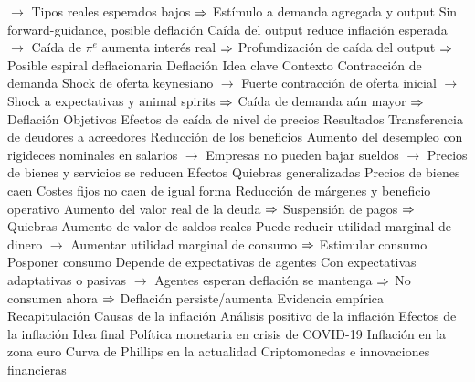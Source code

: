 \documentclass{nuevotema}
\begin{document}
\begin{esquemal}
				\4[] $\to$ Tipos reales esperados bajos
				\4[] $\Rightarrow$ Estímulo a demanda agregada y output
				\4 Sin forward-guidance, posible deflación
				\4[] Caída del output reduce inflación esperada
				\4[] $\to$ Caída de $\pi^e$ aumenta interés real
				\4[] $\Rightarrow$ Profundización de caída del output
				\4[] $\Rightarrow$ Posible espiral deflacionaria
		\2 Deflación
			\3 Idea clave
				\4 Contexto
				\4[] Contracción de demanda
				\4[] Shock de oferta keynesiano
				\4[] $\to$ Fuerte contracción de oferta inicial
				\4[] $\to$ Shock a expectativas y animal spirits
				\4[] $\Rightarrow$ Caída de demanda aún mayor
				\4[] $\Rightarrow$ Deflación
				\4 Objetivos
				\4[] Efectos de caída de nivel de precios
				\4 Resultados
				\4[] Transferencia de deudores a acreedores
				\4[] Reducción de los beneficios
				\4[] Aumento del desempleo con rigideces nominales en salarios
				\4[] $\to$ Empresas no pueden bajar sueldos
				\4[] $\to$ Precios de bienes y servicios se reducen
			\3 Efectos
				\4 Quiebras generalizadas
				\4[] Precios de bienes caen
				\4[] Costes fijos no caen de igual forma
				\4[] Reducción de márgenes y beneficio operativo
				\4[] Aumento del valor real de la deuda
				\4[] $\Rightarrow$ Suspensión de pagos
				\4[] $\Rightarrow$ Quiebras
				\4 Aumento de valor de saldos reales
				\4[] Puede reducir utilidad marginal de dinero
				\4[] $\to$ Aumentar utilidad marginal de consumo
				\4[] $\Rightarrow$ Estimular consumo
				\4 Posponer consumo
				\4[] Depende de expectativas de agentes
				\4[] Con expectativas adaptativas o pasivas
				\4[] $\to$ Agentes esperan deflación se mantenga
				\4[] $\Rightarrow$ No consumen ahora
				\4[] $\Rightarrow$ Deflación persiste/aumenta
			\3 Evidencia empírica
	\1[] 
		\2 Recapitulación
			\3 Causas de la inflación
			\3 Análisis positivo de la inflación
			\3 Efectos de la inflación
		\2 Idea final
			\3 Política monetaria en crisis de COVID-19
			\3 Inflación en la zona euro
			\3 Curva de Phillips en la actualidad
			\3 Criptomonedas e innovaciones financieras
\end{esquemal}
\end{document}
